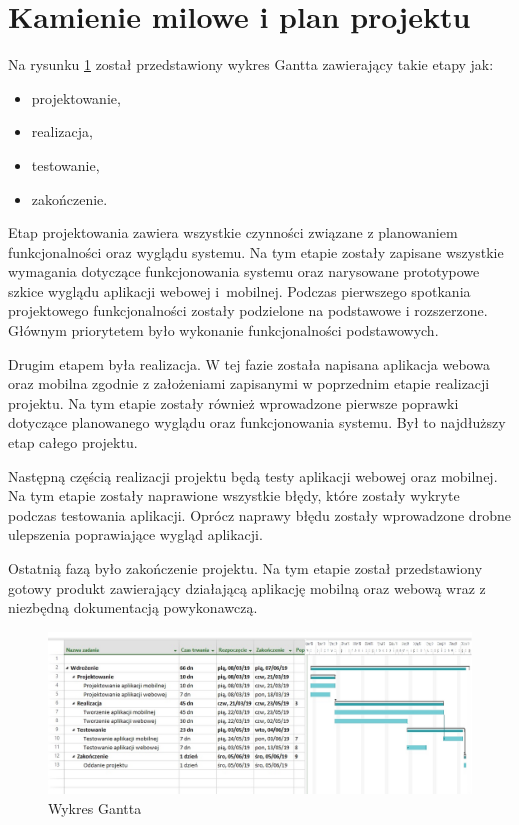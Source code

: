 \documentclass[12pt]{article}
\begin{document}
\newpage
\section{Kamienie milowe i plan projektu}

\noindent Na rysunku \ref{gantt} został przedstawiony wykres Gantta zawierający takie etapy jak: 
\begin{itemize}
\item projektowanie,
\item realizacja,
\item testowanie,
\item zakończenie.
\end{itemize}

Etap projektowania zawiera wszystkie czynności związane z planowaniem funkcjonalności oraz wyglądu systemu. Na tym etapie zostały zapisane wszystkie wymagania dotyczące funkcjonowania systemu oraz narysowane prototypowe szkice wyglądu aplikacji webowej i~mobilnej. Podczas pierwszego spotkania projektowego funkcjonalności zostały podzielone na podstawowe i rozszerzone. Głównym priorytetem było wykonanie funkcjonalności podstawowych.

Drugim etapem była realizacja. W tej fazie została napisana aplikacja webowa oraz mobilna zgodnie z założeniami zapisanymi w poprzednim etapie realizacji projektu. Na tym etapie zostały również wprowadzone pierwsze poprawki dotyczące planowanego wyglądu oraz funkcjonowania systemu. Był to najdłuższy etap całego projektu.

Następną częścią realizacji projektu będą testy aplikacji webowej oraz mobilnej.  Na tym etapie zostały naprawione wszystkie błędy, które zostały wykryte podczas testowania aplikacji. Oprócz naprawy błędu zostały wprowadzone drobne ulepszenia poprawiające wygląd aplikacji. 

Ostatnią fazą było zakończenie projektu. Na tym etapie został przedstawiony gotowy produkt zawierający działającą aplikację mobilną oraz webową wraz z niezbędną dokumentacją powykonawczą. 

	\begin{figure}[H]
		\centering
		\includegraphics[scale=0.75, angle=270]{wykres_ganttaV3.png}
		\caption{Wykres Gantta}
		\label{gantt}
	\end{figure}
	
\end{document}
